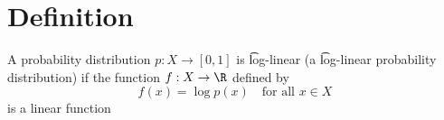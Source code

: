 

\section*{Definition}

A probability distribution $p: X \to [0,1]$ is \t{log-linear} (a \t{log-linear probability distribution}) if the function $f: X \to \R $ defined by
\[
f(x) = \log p(x) \quad \text{for all } x \in X
\]
is a linear function

\blankpage